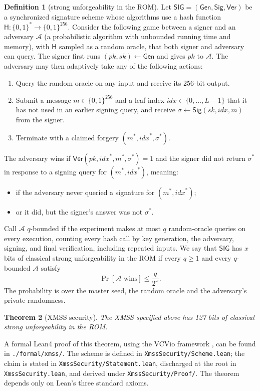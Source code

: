 \documentclass[11pt]{article}
\theoremstyle{definition}
\newtheorem{definition}{Definition}[section]
\theoremstyle{plain}
\newtheorem{theorem}[definition]{Theorem}
\theoremstyle{remark}
\newcommand{\bits}[1]{\{0,1\}^{#1}}
\newcommand{\Gen}{\mathsf{Gen}}
\newcommand{\Sig}{\mathsf{Sig}}
\newcommand{\Ver}{\mathsf{Ver}}
\newcommand{\SIG}{\mathsf{SIG}}
\newcommand{\hash}{\mathsf{H}}
\newcommand{\idx}{\mathit{idx}}
\newcommand{\sk}{\mathit{sk}}
\newcommand{\pk}{\mathit{pk}}
\begin{document}
\begin{definition}[strong unforgeability in the ROM]
Let $\SIG=(\Gen,\Sig,\Ver)$ be a synchronized signature scheme whose algorithms use a hash function $\hash:\bits{*}\to\bits{256}$. Consider the following game between a signer and an adversary $\mathcal A$ (a probabilistic algorithm with unbounded running time and memory), with $\hash$ sampled as a random oracle, that both signer and adversary can query. The signer first runs $(\pk,\sk)\gets\Gen$ and gives $\pk$ to $\mathcal A$. The adversary may then adaptively take any of the following actions:
\begin{enumerate}[leftmargin=2em]
  \item Query the random oracle on any input and receive its 256-bit output.
  \item Submit a message $m\in\bits{256}$ and a leaf index $\idx\in\{0,\ldots,L-1\}$ that it has not used in an earlier signing query, and receive $\sigma\gets\Sig(\sk,\idx,m)$ from the signer.
  \item Terminate with a claimed forgery $(m^*,\idx^*,\sigma^*)$.
\end{enumerate}
The adversary wins if $\Ver(\pk,\idx^*,m^*,\sigma^*)=1$ and the signer did not return $\sigma^*$ in response to a signing query for $(m^*,\idx^*)$, meaning:
\begin{itemize}[leftmargin=2em]
  \item if the adversary never queried a signature for $(m^*,\idx^*)$;
  \item or it did, but the signer's answer was not $\sigma^*$.
\end{itemize}

Call $\mathcal A$ $q$-bounded if the experiment makes at most $q$ random-oracle queries on every execution, counting every hash call by key generation, the adversary, signing, and final verification, including repeated inputs. We say that $\SIG$ has $x$ bits of classical strong unforgeability in the ROM if every $q\geq1$ and every $q$-bounded $\mathcal A$ satisfy
\[
  \Pr[\mathcal A\text{ wins}]\leq\frac{q}{2^{x}}.
\]
The probability is over the master seed, the random oracle and the adversary's private randomness.
\end{definition}

\begin{theorem}[XMSS security]
The XMSS specified above has 127 bits of classical strong unforgeability in the ROM.
\end{theorem}

A formal Lean4 proof of this theorem, using the VCVio framework \cite{VCVio}, can be found in \texttt{./formal/xmss/}. The scheme is defined in \texttt{XmssSecurity/Scheme.lean}; the claim is stated in \texttt{XmssSecurity/Statement.lean}, discharged at the root in \texttt{XmssSecurity.lean}, and derived under \texttt{XmssSecurity/Proof/}. The theorem depends only on Lean's three standard axioms.
\end{document}
